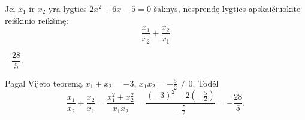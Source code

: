 \begin{salyga}
Jei $x_1$ ir $x_2$ yra lygties $2x^2 + 6x - 5 = 0$ šaknys, nesprendę lygties apskaičiuokite reiškinio reikšmę:
    \[ \frac{x_1}{x_2} + \frac{x_2}{x_1} \]
\end{salyga}

\begin{atsakymas}
$-\dfrac{28}{5}$.
\end{atsakymas}

\begin{sprendimas}
Pagal Vijeto teoremą $x_1+x_2=-3$, $x_1x_2=-\frac52\ne0$. Todėl
\[
\frac{x_1}{x_2}+\frac{x_2}{x_1}
=\frac{x_1^2+x_2^2}{x_1x_2}
=\frac{(-3)^2-2(-\frac52)}{-\frac52}
=-\frac{28}{5}.
\]
\end{sprendimas}

